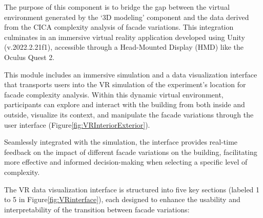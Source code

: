 

The purpose of this component is to bridge the gap between the virtual environment generated by the `3D modeling' component and the data derived from the CICA complexity analysis of facade variations.
This integration culminates in an immersive virtual reality application developed using Unity (v.2022.2.21f1), accessible through a Head-Mounted Display (HMD) like the Oculus Quest 2.

This module includes an immersive simulation and a data visualization interface that transports users into the VR simulation of the experiment's location for facade complexity analysis.
Within this dynamic virtual environment, participants can explore and interact with the building from both inside and outside, visualize its context, and manipulate the facade variations through the user interface (Figure\ref{fig:VRInteriorExterior}).

Seamlessly integrated with the simulation, the interface provides real-time feedback on the impact of different facade variations on the building, facilitating more effective and informed decision-making when selecting a specific level of complexity.


The VR data visualization interface is structured into five key sections (labeled 1 to 5 in Figure\ref{fig:VRinterface}), each designed to enhance the usability and interpretability of the transition between facade variations:

